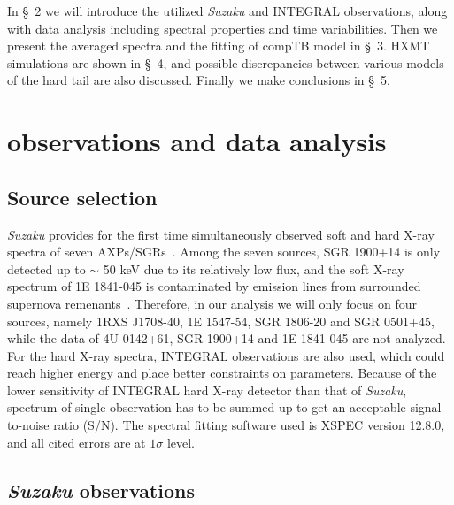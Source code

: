 \documentclass[]{raa}
\begin{document}
In \S~2 we will introduce the utilized {\it Suzaku} and INTEGRAL observations, along with data analysis including spectral properties and time variabilities.
%
Then we present the averaged spectra and the fitting of compTB model in \S~3. 
%
HXMT simulations are shown in \S~4, and possible discrepancies between various models of the hard tail are also discussed.
%
Finally we make conclusions in \S~5. 

\section{observations and data analysis}

\subsection{Source selection}

{\it Suzaku} provides for the first time simultaneously observed soft and hard X-ray spectra of seven AXPs/SGRs~\citep{Enoto10}.
%
Among the seven sources, SGR 1900+14 is only detected up to $\sim$ 50 keV due to its relatively low flux, and the soft X-ray spectrum of 1E 1841-045 is contaminated by emission lines from surrounded supernova remenants~\citep[see][Fig. 1]{Enoto10}. 
%
Therefore, in our analysis we will only focus on four sources, namely 1RXS J1708-40, 1E 1547-54, SGR 1806-20 and SGR 0501+45, while the data of 4U 0142+61, SGR 1900+14 and 1E 1841-045 are not analyzed.
%
%
%
For the hard X-ray spectra, INTEGRAL observations are also used, which could reach higher energy and place better constraints on parameters.
%
Because of the lower sensitivity of INTEGRAL hard X-ray detector than that of {\it Suzaku}, spectrum of single observation has to be summed up to get an acceptable signal-to-noise ratio (S/N).
%
The spectral fitting software used is XSPEC version 12.8.0, and all cited errors are at $1 \sigma$ level.


\subsection{{\it Suzaku} observations}
\end{document}
